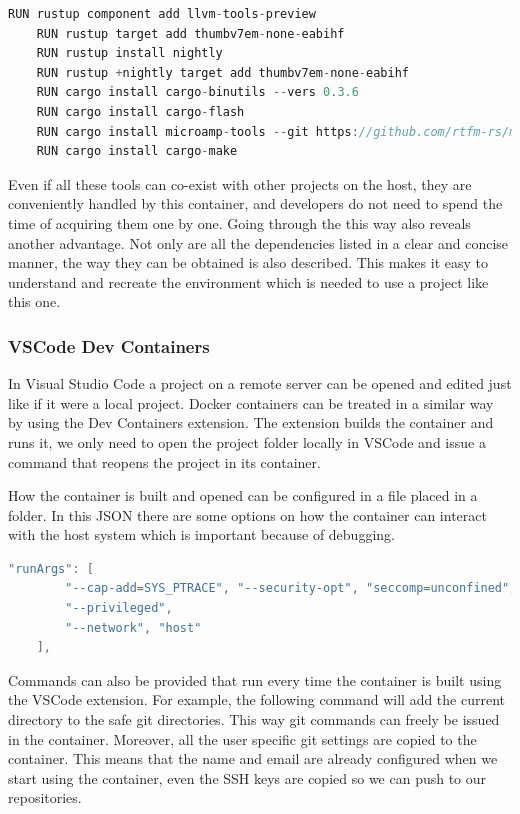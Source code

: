 \begin{lstlisting}[language=C,frame=single,float=!ht,label={lst:docker-cargo},caption={Installing Rust Specific Tools in the Container}]
    RUN rustup component add llvm-tools-preview
    RUN rustup target add thumbv7em-none-eabihf
    RUN rustup install nightly
    RUN rustup +nightly target add thumbv7em-none-eabihf
    RUN cargo install cargo-binutils --vers 0.3.6
    RUN cargo install cargo-flash
    RUN cargo install microamp-tools --git https://github.com/rtfm-rs/microamp
    RUN cargo install cargo-make
\end{lstlisting}

Even if all these tools can co-exist with other projects on the host, they are conveniently handled by this container, and developers do not need to spend the time of acquiring them one by one. Going through the  this way also reveals another advantage. Not only are all the dependencies listed in a clear and concise manner, the way they can be obtained is also described. This makes it easy to understand and recreate the environment which is needed to use a project like this one.

\subsubsection{VSCode Dev Containers}

In Visual Studio Code a project on a remote server can be opened and edited just like if it were a local project. Docker containers can be treated in a similar way by using the Dev Containers extension. The extension builds the container and runs it, we only need to open the project folder locally in VSCode and issue a command that reopens the project in its container.

How the container is built and opened can be configured in a  file placed in a  folder. In this JSON there are some options on how the container can interact with the host system which is important because of debugging.

\begin{lstlisting}[language=C,frame=single,float=!ht,label={lst:devcont-args},caption={VSCode Devcontainer Arguments}]
	"runArgs": [
		"--cap-add=SYS_PTRACE", "--security-opt", "seccomp=unconfined",
		"--privileged",
		"--network", "host"
	],
\end{lstlisting}

Commands can also be provided that run every time the container is built using the VSCode extension. For example, the following command will add the current directory to the safe git directories. This way git commands can freely be issued in the container. Moreover, all the user specific git settings are copied to the container. This means that the name and email are already configured when we start using the container, even the SSH keys are copied so we can push to our repositories.

